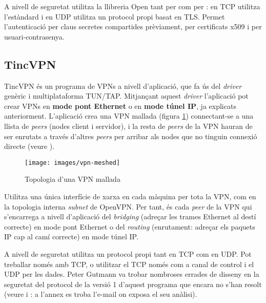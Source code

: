 A nivell de seguretat utilitza la llibreria Open tant per  com per : en TCP utilitza l'estàndard  i en UDP utilitza un protocol propi basat en TLS. Permet l'autenticació per claus secretes compartides prèviament, per certificats x509 i per usuari-contrasenya.

\subsection{TincVPN}
TincVPN és un programa de VPNs a nivell d'aplicació, que fa ús del \emph{driver} genèric i multiplataforma TUN/TAP. Mitjançant aquest \emph{driver} l'aplicació pot crear VPNs en \textbf{mode pont Ethernet} o en \textbf{mode túnel IP}, ja explicats anteriorment. L'aplicació crea una VPN mallada (figura \ref{F:vpn-meshed}) connectant-se a una llista de \emph{peers} (nodes client i servidor), i la resta de \emph{peers} de la VPN hauran de ser enrutats a través d'altres \emph{peers} per arribar als nodes que no tinguin connexió directe (veure \cite{tinc-doc}).
\begin{figure}[htb]
\centering
\texttt{[image: images/vpn-meshed]}
\caption{Topologia d'una VPN mallada}
\label{F:vpn-meshed}
\end{figure}

Utilitza una única interfície de xarxa en cada màquina per tota la VPN, com en la topologia interna \emph{subnet} de OpenVPN. Per tant, és cada \emph{peer} de la VPN qui s'encarrega a nivell d'aplicació del \emph{bridging} (adreçar les trames Ethernet al destí correcte) en mode pont Ethernet o del \emph{routing} (enrutament: adreçar els paquets IP cap al camí correcte) en mode túnel IP.

\label{TincVPN-Sec}
A nivell de seguretat utilitza un protocol propi tant en TCP com en UDP. Pot treballar només amb TCP, o utilitzar el TCP només com a canal de control i el UDP per les dades. Peter Gutmann va trobar nombroses errades de disseny en la seguretat del protocol de la versió 1 d'aquest programa que encara no s'han resolt (veure \cite{latm-metzdowd} i \cite{tinc-sec}: a l'annex  es troba l'e-mail on exposa el seu anàlisi).

